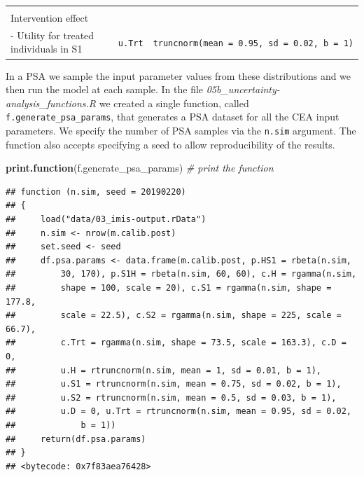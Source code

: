\documentclass[]{article}
\newenvironment{Shaded}{\begin{snugshade}}{\end{snugshade}}
\newcommand{\KeywordTok}[1]{\textcolor[rgb]{0.13,0.29,0.53}{\textbf{#1}}}
\newcommand{\CommentTok}[1]{\textcolor[rgb]{0.56,0.35,0.01}{\textit{#1}}}
\newcommand{\NormalTok}[1]{#1}
\begin{document}
\begin{longtable}[]{@{}lcc@{}}
\begin{minipage}[t]{0.20\columnwidth}
\end{minipage}\tabularnewline
\begin{minipage}[t]{0.43\columnwidth}\raggedright\strut
Intervention effect\strut
\end{minipage} & \begin{minipage}[t]{0.18\columnwidth}\centering\strut
\strut
\end{minipage} & \begin{minipage}[t]{0.20\columnwidth}\centering\strut
\strut
\end{minipage}\tabularnewline
\begin{minipage}[t]{0.43\columnwidth}\raggedright\strut
- Utility for treated individuals in S1\strut
\end{minipage} & \begin{minipage}[t]{0.18\columnwidth}\centering\strut
\texttt{u.Trt}\strut
\end{minipage} & \begin{minipage}[t]{0.20\columnwidth}\centering\strut
\texttt{truncnorm(mean\ =\ 0.95,\ sd\ =\ 0.02,\ b\ =\ 1)}\strut
\end{minipage}\tabularnewline
\bottomrule
\end{longtable}

In a PSA we sample the input parameter values from these distributions
and we then run the model at each sample. In the file
\emph{05b\_uncertainty-analysis\_functions.R} we created a single
function, called \texttt{f.generate\_psa\_params}, that generates a PSA
dataset for all the CEA input parameters. We specify the number of PSA
samples via the \texttt{n.sim} argument. The function also accepts
specifying a seed to allow reproducibility of the results.

\begin{Shaded}
\begin{Highlighting}[]
\KeywordTok{print.function}\NormalTok{(f.generate_psa_params) }\CommentTok{# print the function }
\end{Highlighting}
\end{Shaded}

\begin{verbatim}
## function (n.sim, seed = 20190220) 
## {
##     load("data/03_imis-output.rData")
##     n.sim <- nrow(m.calib.post)
##     set.seed <- seed
##     df.psa.params <- data.frame(m.calib.post, p.HS1 = rbeta(n.sim, 
##         30, 170), p.S1H = rbeta(n.sim, 60, 60), c.H = rgamma(n.sim, 
##         shape = 100, scale = 20), c.S1 = rgamma(n.sim, shape = 177.8, 
##         scale = 22.5), c.S2 = rgamma(n.sim, shape = 225, scale = 66.7), 
##         c.Trt = rgamma(n.sim, shape = 73.5, scale = 163.3), c.D = 0, 
##         u.H = rtruncnorm(n.sim, mean = 1, sd = 0.01, b = 1), 
##         u.S1 = rtruncnorm(n.sim, mean = 0.75, sd = 0.02, b = 1), 
##         u.S2 = rtruncnorm(n.sim, mean = 0.5, sd = 0.03, b = 1), 
##         u.D = 0, u.Trt = rtruncnorm(n.sim, mean = 0.95, sd = 0.02, 
##             b = 1))
##     return(df.psa.params)
## }
## <bytecode: 0x7f83aea76428>
\end{verbatim}
\end{document}
